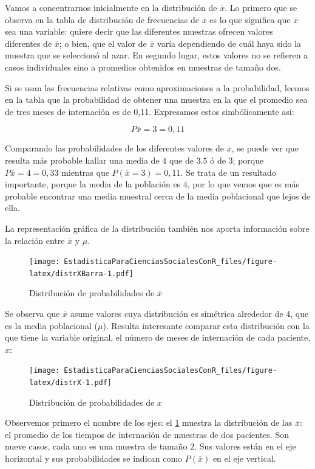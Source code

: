 \documentclass[]{book}
\begin{document}
Vamos a concentrarnos inicialmente en la distribución de \(\overline{x}\).
Lo primero que se observa en la tabla de distribución de frecuencias de
\(\overline{x}\) es lo que significa que \(\overline{x}\) sea una variable:
quiere decir que las diferentes muestras ofrecen valores diferentes de
\(\overline{x}\); o bien, que el valor de \(\overline{x}\) varía dependiendo
de cuál haya sido la muestra que se seleccionó al azar. En segundo
lugar, estos valores no se refieren a casos individuales sino a
promedios obtenidos en muestras de tamaño dos.

Si se usan las frecuencias relativas como aproximaciones a la
probabilidad, leemos en la tabla que la probabilidad de obtener una
muestra en la que el promedio sea de tres meses de internación es de
0,11. Expresamos estos simbólicamente así:

\[P\overline{x} = 3 = 0,11\]

Comparando las probabilidades de los diferentes valores de
\(\overline{x}\), se puede ver que resulta más probable hallar una media
de \(4\) que de \(3.5\) ó de \(3\); porque \(P\overline{x} = 4 = 0,33\)
mientras que \(P(\overline{x} = 3) = 0,11\). Se trata de un resultado
importante, porque la media de la población es \(4\), por lo que vemos que es más probable encontrar una media muestral cerca de la media
poblacional que lejos de ella.

La representación gráfica de la distribución también nos aporta
información sobre la relación entre \(\overline{x}\) y \(\mu\).

\begin{figure}
\centering
\texttt{[image: EstadisticaParaCienciasSocialesConR\_files/figure-latex/distrXBarra-1.pdf]}
\caption{\label{fig:distrXBarra}Distribución de probabilidades de \(\overline{x}\)}
\end{figure}

Se observa que \(\overline{x}\) asume valores cuya distribución es
simétrica alrededor de \(4\), que es la media poblacional (\(\mu\)). Resulta interesante comparar esta distribución con la que tiene la variable original, el número de meses de internación de cada paciente, \(x\):

\begin{figure}
\centering
\texttt{[image: EstadisticaParaCienciasSocialesConR\_files/figure-latex/distrX-1.pdf]}
\caption{\label{fig:distrX}Distribución de probabilidades de \(x\)}
\end{figure}

Observemos primero el nombre de los ejes: el \ref{fig:distrXBarra} muestra la
distribución de las \(\overline{x}\): el promedio de los tiempos de
internación de muestras de dos pacientes. Son nueve casos, cada uno es
una muestra de tamaño \(2\). Sus valores están en el eje horizontal y sus
probabilidades se indican como \(P(\overline{x})\) en el eje vertical.
\end{document}
